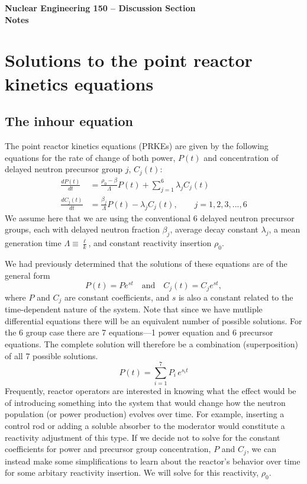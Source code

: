 \documentclass{report}
\begin{document}
\begin{center}
\textbf{\large Nuclear Engineering 150 -- Discussion Section}\\ 
\textbf{Notes}
\end{center}




\section*{Solutions to the point reactor kinetics equations} 

\subsection*{The inhour equation}

The point reactor kinetics equations (PRKEs) are given by the following equations for the rate of change of both power, $P(t)$ and concentration of delayed neutron precursor group $j$, $C_j(t)$:
\begin{align*}
\frac{dP(t)}{dt}	&= \frac{\rho_0 - \beta}{\Lambda} P(t) + \sum_{j=1}^6 \lambda_j C_j(t) \\
\frac{dC_j(t)}{dt}	&= \frac{\beta_j}{\Lambda} P(t) - \lambda_j C_j(t) , \qquad j= 1,2,3,...,6 
\end{align*}
We assume here that we are using the conventional 6 delayed neutron precursor groups, each with delayed neutron fraction $\beta_j$, average decay constant $\lambda_j$, a mean generation time $\Lambda \equiv \frac{\ell}{k}$, and constant reactivity insertion $\rho_0$.

We had previously determined that the solutions of these equations are of the general form 
$$ P(t) = Pe^{st} \quad\text{and}\quad C_j(t) = C_je^{st} ,$$
where $P$ and $C_j$ are constant coefficients, and $s$ is also a constant related to the time-dependent nature of the system. Note that since we have mutliple differential equations there will be an equivalent number of possible solutions. For the 6 group case there are 7 equations---1 power equation and 6 precursor equations. The complete solution will therefore be a combination (superposition) of all 7 possible solutions.
$$ P(t) = \sum_{i=1}^7 P_i \, e^{s_i t} $$
Frequently, reactor operators are interested in knowing what the effect would be of introducing something into the system that would change how the neutron population (or power production) evolves over time. For example, inserting a control rod or adding a soluble absorber to the moderator would constitute a reactivity adjustment of this type. If we decide not to solve for the constant coefficients for power and precursor group concentration, $P$ and $C_j$, we can instead make some simplifications to learn about the reactor's behavior over time for some arbitary reactivity insertion. We will solve for this reactivity, $\rho_0$. 
\end{document}
